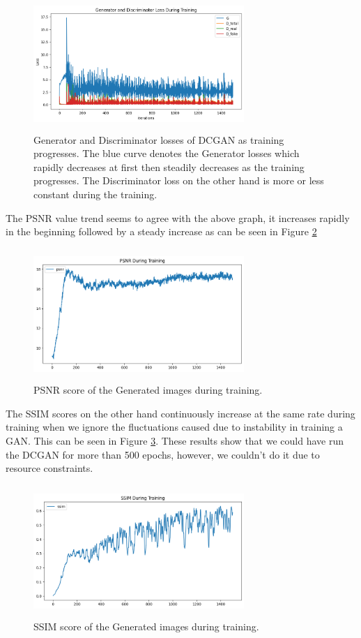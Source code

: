 \documentclass[10pt,journal,compsoc]{IEEEtran}
\begin{document}
\begin{figure}[h]
\centering
\includegraphics[width=8cm, height=5cm]{gen_disc_loss.png}
\caption{
  Generator and Discriminator losses of DCGAN as training progresses. The blue curve denotes the Generator losses which rapidly decreases at first
  then steadily decreases as the training progresses. The Discriminator loss on the other hand is more or less constant during the training.
}
\label{figure:4}
\end{figure}

The PSNR value trend seems to agree with the above graph, it increases rapidly in the beginning followed by a steady increase as can be seen in Figure \ref{figure:5}

\begin{figure}[h]
\centering
\includegraphics[width=8cm, height=5cm]{psnr.png}
\caption{
  PSNR score of the Generated images during training.
}
\label{figure:5}
\end{figure}

The SSIM scores on the other hand continuously increase at the same rate during training when we ignore the fluctuations caused due to instability in training a GAN.
This can be seen in Figure \ref{figure:6}. These results show that we could have run the DCGAN for more than 500 epochs, however, we couldn't do it due to resource
constraints.

\begin{figure}[h]
\centering
\includegraphics[width=8cm, height=5cm]{ssim.png}
\caption{
  SSIM score of the Generated images during training.
}
\label{figure:6}
\end{figure}
\end{document}
